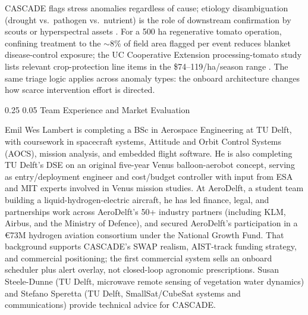 \documentclass[11pt,letterpaper]{article}
\makeatletter
\renewcommand\section{\@startsection{section}{1}{\z@}
  {0.25\baselineskip}
  {0.05\baselineskip}
  {\normalfont\large\bfseries}}
\makeatother
\begin{document}
CASCADE flags stress anomalies regardless of cause; etiology disambiguation (drought vs.\ pathogen vs.\ nutrient) is the role of downstream confirmation by scouts or hyperspectral assets \cite{gold-cida-seminar}. For a 500 ha regenerative tomato operation, confining treatment to the $\sim$8\% of field area flagged per event reduces blanket disease-control exposure; the UC Cooperative Extension processing-tomato study lists relevant crop-protection line items in the \$74--119/ha/season range \cite{uc-tomato-cost}. The same triage logic applies across anomaly types: the onboard architecture changes how scarce intervention effort is directed.

\section{Team Experience and Market Evaluation}

Emil Wes Lambert is completing a BSc in Aerospace Engineering at TU Delft, with coursework in spacecraft systems, Attitude and Orbit Control Systems (AOCS), mission analysis, and embedded flight software. He is also completing TU Delft's DSE on an original five-year Venus balloon-aerobot concept, serving as entry/deployment engineer and cost/budget controller with input from ESA and MIT experts involved in Venus mission studies. At AeroDelft, a student team building a liquid-hydrogen-electric aircraft, he has led finance, legal, and partnerships work across AeroDelft's 50+ industry partners (including KLM, Airbus, and the Ministry of Defence), and secured AeroDelft’s participation in a €73M hydrogen aviation consortium under the National Growth Fund. That background supports CASCADE's SWAP realism, AIST-track funding strategy, and commercial positioning; the first commercial system sells an onboard scheduler plus alert overlay, not closed-loop agronomic prescriptions. Susan Steele-Dunne (TU Delft, microwave remote sensing of vegetation water dynamics) and Stefano Speretta (TU Delft, SmallSat/CubeSat systems and communications) provide technical advice for CASCADE.
\end{document}
